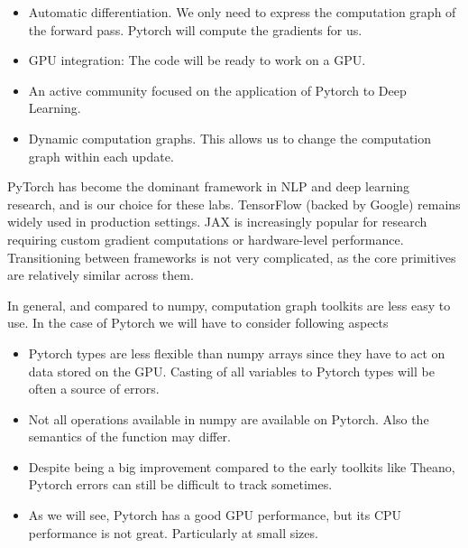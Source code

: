 \begin{itemize}
\item Automatic differentiation. We only need to express the computation graph of the forward pass. Pytorch will compute the gradients for us. 
\item GPU integration: The code will be ready to work on a GPU.
\item An active community focused on the application of Pytorch to Deep Learning.
\item Dynamic computation graphs. This allows us to change the computation graph within each update. 
\end{itemize}

PyTorch has become the dominant framework in NLP and deep learning research, and is our choice for these labs. TensorFlow (backed by Google) remains widely used in production settings. JAX is increasingly popular for research requiring custom gradient computations or hardware-level performance. Transitioning between frameworks is not very complicated, as the core primitives are relatively similar across them.

In general, and compared to numpy, computation graph toolkits are less easy to use.
In the case of Pytorch we will have to consider following aspects 

\begin{itemize}
\item Pytorch types are less flexible than numpy arrays since they have to act on data stored on the GPU. Casting of all variables to Pytorch types will be often a source of errors.
\item Not all operations available in numpy are available on Pytorch. Also the semantics of the function may differ.
\item Despite being a big improvement compared to the early toolkits like Theano, Pytorch errors can still be difficult to track sometimes.
\item As we will see, Pytorch has a good GPU performance, but its CPU performance is not great. Particularly at small sizes. 
\end{itemize}



